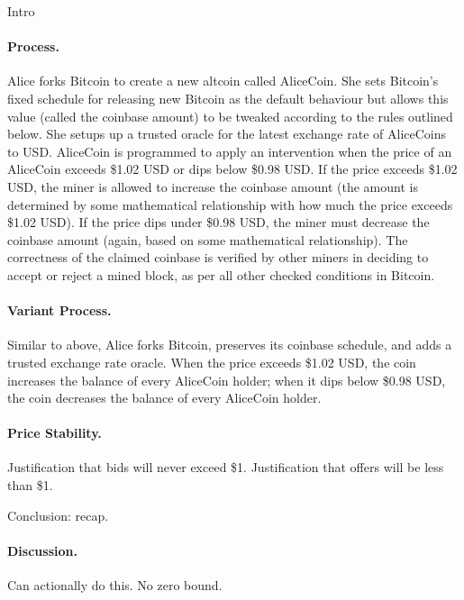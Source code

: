 Intro

\paragraph{Process.} Alice forks Bitcoin to create a new altcoin called AliceCoin. She sets Bitcoin's fixed schedule for releasing new Bitcoin as the default behaviour but allows this value (called the coinbase amount) to be tweaked according to the rules outlined below. She setups up a trusted oracle for the latest exchange rate of AliceCoins to USD. AliceCoin is programmed to apply an intervention when the price of an AliceCoin exceeds \$1.02 USD or dips below \$0.98 USD. If the price exceeds \$1.02 USD, the miner is allowed to increase the coinbase amount (the amount is determined by some mathematical relationship with how much the price exceeds \$1.02 USD). If the price dips under \$0.98 USD, the miner must decrease the coinbase amount (again, based on some mathematical relationship). The correctness of the claimed coinbase is verified by other miners in deciding to accept or reject a mined block, as per all other checked conditions in Bitcoin.

\paragraph{Variant Process.} Similar to above, Alice forks Bitcoin, preserves its coinbase schedule, and adds a trusted exchange rate oracle. When the price exceeds \$1.02 USD, the coin increases the balance of every AliceCoin holder; when it dips below \$0.98 USD, the coin decreases the balance of every AliceCoin holder.

\paragraph{Price Stability.} Justification that bids will never exceed \$1. Justification that offers will be less than \$1.

Conclusion: recap.

\paragraph{Discussion.} Can actionally do this. No zero bound.



